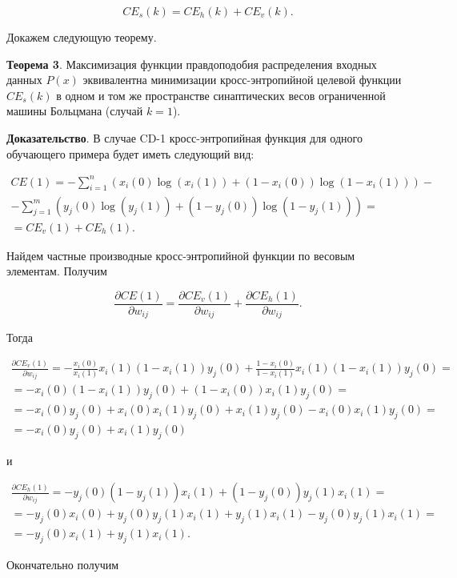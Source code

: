 \begin{equation}
	CE_s(k) = CE_h(k)+CE_v(k).
\end{equation}

Докажем следующую теорему.

\textbf{Теорема 3}. Максимизация функции правдоподобия распределения входных данных $P(x)$ эквивалентна минимизации кросс-энтропийной целевой функции $CE_s(k)$ в одном и том же пространстве синаптических весов ограниченной машины Больцмана (случай $k=1$).

\textbf{Доказательство}. В случае CD-1 кросс-энтропийная функция для одного обучающего примера будет иметь следующий вид:

\begin{multline}
	CE(1) = -\sum_{i=1}^n (x_i(0)\log(x_i(1))+(1-x_i(0))\log(1-x_i(1)))-\\-\sum_{j=1}^m ( y_j(0)\log(y_j(1))+(1-y_j(0))\log(1-y_j(1))) = \\ = CE_v(1)+CE_h(1).
\end{multline}

Найдем частные производные кросс-энтропийной функции по весовым элементам. Получим

\begin{equation*}
	\frac{\partial CE(1)}{\partial w_{ij}} = \frac{\partial CE_v(1)}{\partial w_{ij}} + \frac{\partial CE_h(1)}{\partial w_{ij}}.
\end{equation*}

Тогда

\begin{multline*}
	\frac{\partial CE_v(1)}{\partial w_{ij}} = -\frac{x_i(0)}{x_i(1)}x_i(1)(1-x_i(1))y_j(0)+\frac{1-x_i(0)}{1-x_i(1)}x_i(1)(1-x_i(1))y_j(0) = \\ = -x_i(0)(1-x_i(1))y_j(0)+(1-x_i(0))x_i(1)y_j(0)=\\=-x_i(0)y_j(0)+x_i(0)x_i(1)y_j(0)+x_i(1)y_j(0)-x_i(0)x_i(1)y_j(0)=\\=-x_i(0)y_j(0)+x_i(1)y_j(0) 
\end{multline*}

и

\begin{multline*}
	\frac{\partial CE_h(1)}{\partial w_{ij}} = -y_j(0)(1-y_j(1))x_i(1)+(1-y_j(0))y_j(1)x_i(1) = \\ = -y_j(0)x_i(0)+y_j(0)y_j(1)x_i(1)+y_j(1)x_i(1)-y_j(0)y_j(1)x_i(1) = \\ = -y_j(0)x_i(1)+y_j(1)x_i(1). 
\end{multline*}

Окончательно получим

